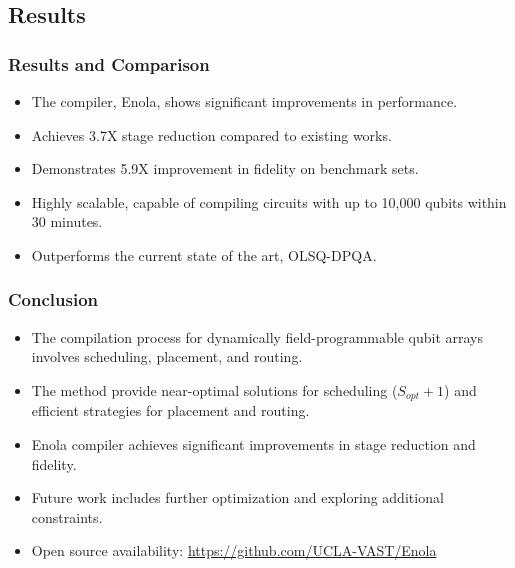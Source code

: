 \documentclass[18 pt]{beamer}
\begin{document}
\subsection{Results}
\begin{frame}
    \frametitle{Results and Comparison}
    \begin{itemize}
        \item The compiler, Enola, shows significant improvements in performance.
        \item Achieves 3.7X stage reduction compared to existing works.
        \item Demonstrates 5.9X improvement in fidelity on benchmark sets.
        \item Highly scalable, capable of compiling circuits with up to 10,000 qubits within 30 minutes.
        \item Outperforms the current state of the art, OLSQ-DPQA.
    \end{itemize}
\end{frame}

\begin{frame}
    \frametitle{Conclusion}
    \begin{itemize}
        \item The compilation process for dynamically field-programmable qubit arrays involves scheduling, placement, and routing.
        \item The method provide near-optimal solutions for scheduling ($S_{opt} +1$) and efficient strategies for placement and routing.
        \item Enola compiler achieves significant improvements in stage reduction and fidelity.
        \item Future work includes further optimization and exploring additional constraints.
        \item Open source availability: \url{https://github.com/UCLA-VAST/Enola}
    \end{itemize}
\end{frame}
\end{document}
